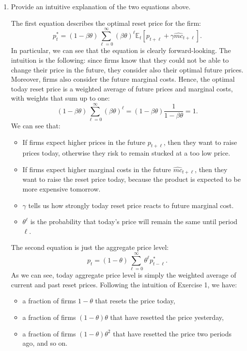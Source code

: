 \documentclass[dvipsnames,11pt]{article}
\begin{document}
    \begin{enumerate}
    
        \item Provide an intuitive explanation of the two equations above.
    
            \begin{solution}
    The first equation describes the optimal reset price for the firm:
    \[
    p^*_t = (1 - \beta \theta) \sum_{\ell=0}^\infty (\beta \theta)^\ell \mathbb{E}_t [p_{t+\ell} + \gamma \widehat{mc}_{t + \ell }].
    \]
    In particular, we can see that the equation is clearly forward-looking. The intuition is the following: since firms know that they could not be able to change their price in the future, they consider also their optimal future prices. Moreover, firms also consider the future marginal costs. Hence, the optimal today reset price is a weighted average of future prices and marginal costs, with weights that sum up to one:
    \[
    (1-\beta \theta)\sum_{\ell =0}^\infty (\beta \theta) ^\ell = (1-\beta \theta)\frac{1}{1-\beta \theta}=1.
    \]
    We can see that:
    \begin{itemize}
        \item If firms expect higher prices in the future $p_{t+\ell}$, then they want to raise prices today, otherwise they risk to remain stucked at a too low price.
        \item If firms expect higher marginal costs in the future $\widehat{mc}_{t+\ell}$, then they want to raise the reset price today, because the product is expected to be more expensive tomorrow.
        \item $\gamma$ tells us how strongly today reset price reacts to future marginal cost.
        \item $\theta^\ell$ is the probability that today's price will remain the same until period $\ell$. 
    \end{itemize}
    The second equation is just the aggregate price level:
    \[
    p_t = (1 - \theta) \sum_{\ell=0}^\infty \theta^\ell p^*_{t-\ell}.
    \]
    As we can see, today aggregate price level is simply the weighted average of current and past reset prices. Following the intuition of Exercise 1, we have:
    \begin{itemize}
        \item a fraction of firms $1-\theta$ that resets the price today,
        \item a fraction of firms $(1-\theta)\theta$ that have resetted the price yesterday,
        \item a fraction of firms $(1-\theta)\theta^2$ that have resetted the price two periods ago, and so on.
    \end{itemize}
    

\end{solution}
\end{enumerate}
\end{document}
